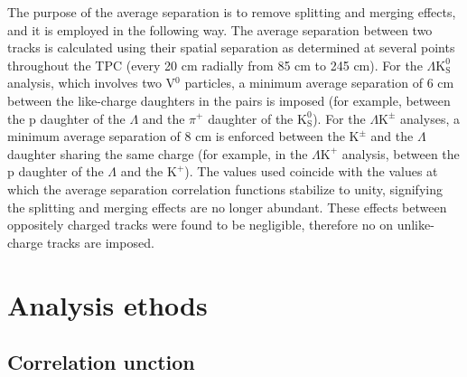 \documentclass[ALICE,manyauthors]{cernphprep}
\newcommand{\Lam}{$\Lambda$\xspace}
\newcommand{\KchP}{$\mathrm{K^{+}}$\xspace}
\newcommand{\Kpm}{$\mathrm{K^{\pm}}$\xspace}
\newcommand{\Ks}{$\mathrm{K^{0}_{S}}$\xspace}
\newcommand{\LamKchP}{$\Lambda\mathrm{K^{+}}$\xspace}
\newcommand{\LamKpm}{$\Lambda\mathrm{K^{\pm}}$\xspace}
\newcommand{\LamKs}{$\Lambda\mathrm{K^{0}_{S}}$\xspace}
\newcommand{\Vz}{V$^{0}$\xspace}
\begin{document}
The purpose of the average separation {\color{red}{cut}} {\color{blue}{constraint}} is to remove splitting and merging effects, and it is employed in the following way.  
The average separation between two tracks is calculated using their spatial separation as determined at several points throughout the TPC (every 20 cm radially from 85 cm to 245 cm).
For the \LamKs analysis, which involves two \Vz particles, a minimum average separation {\color{red}{cut}} {\color{blue}{constraint}} of 6 cm between the like-charge daughters in the pairs is imposed (for example, between the p daughter of the \Lam and the $\pi^{+}$ daughter of the \Ks).
For the \LamKpm analyses, a minimum average separation {\color{red}{cut}} {\color{blue}{constraint}} of 8 cm is enforced between the \Kpm and the \Lam daughter sharing the same charge (for example, in the \LamKchP analysis, between the p daughter of the \Lam and the \KchP).
The {\color{red}{cut}} {\color{blue}{constraint}} values used coincide with the values at which the average separation correlation functions stabilize to unity, signifying the splitting and merging effects are no longer abundant.
These effects between oppositely charged tracks were found to be negligible, therefore no {\color{red}{cuts}} {\color{blue}{constraints}} on unlike-charge tracks are imposed.

\section{Analysis {\color{red}{M}}{\color{blue}{m}}ethods}
\label{sec:AnalysisMethods}

\subsection{Correlation {\color{red}{F}}{\color{blue}{f}}unction}
\label{sec:CorrelationFunction}
{\color{red}{Two-particle correlation functions are built as the ratio of the covariant two-particle and single-particle spectra:}}
\end{document}
